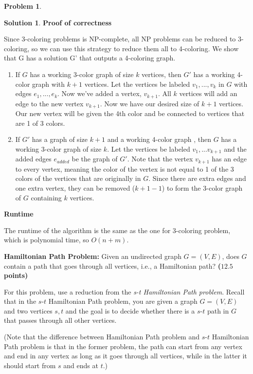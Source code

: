 \documentclass{article}
\theoremstyle{definition}
\newtheorem{problem}{Problem}
\newtheorem*{solution*}{Solution}
\newenvironment{solution}{\begin{solution*}}{{} \end{solution*}}
\newcommand{\grade}[1]{\hfill{\textbf{($\mathbf{#1}$ points)}}}
\begin{document}
\begin{problem}
\begin{enumerate}[label=(\alph*)]
\begin{solution}
		\item\textbf{Proof of correctness}
		\item Since 3-coloring problems is NP-complete, all NP problems can be reduced to 3-coloring, so we can use this strategy to reduce them all to 4-coloring. We show that G has a solution G' that outputs a 4-coloring graph.
		\begin{enumerate}
		\item If $G$ has a working 3-color graph of size $k$ vertices, then $G'$ has a working 4-color graph with $k+1$ vertices. Let the vertices be labeled $v_1, ... , v_k$ in $G$ with edges $e_1, ..., e_k$. Now we've added a vertex, $v_{k+1}$. All $k$ vertices will add an edge to the new vertex $v_{k+1}$. Now we have our desired size of $k + 1$ vertices. Our new vertex will be given the 4th color and be connected to vertices that are 1 of 3 colors. 
		\item If $G'$ has a graph of size $k + 1$ and a working 4-color graph , then $G$ has a working 3-color graph of size $k$. Let the vertices be labeled $v_1, ... v_{k+1}$ and the added edges $e_{added}$ be the graph of $G'$. Note that the vertex $v_{k+1}$ has an edge to every vertex, meaning the color of the vertex is not equal to 1 of the 3 colors of the vertices that are originally in $G$. Since there are extra edges and one extra vertex, they can be removed ($k+1-1$) to form the 3-color graph of $G$ containing $k$ vertices. 
		\end{enumerate}

		\item\textbf{Runtime}
		\item The runtime of the algorithm is the same as the one for 3-coloring problem, which is polynomial time, so $O(n+m)$.
		\end{solution}
		
		\newpage
		\item \textbf{Hamiltonian Path Problem:} Given an undirected graph $G=(V,E)$, does $G$ contain a path that goes through all vertices, i.e., a Hamiltonian path?  \grade{12.5}
	
	\medskip
		For this problem, use a reduction from the \emph{s-t Hamiltonian Path problem}. Recall that in the $s$-$t$ Hamiltonian Path problem, you are given a graph $G=(V,E)$ and two vertices $s,t$ and the goal is to decide whether there is a $s$-$t$ 
		path in $G$ that passes through all other vertices. 
		
		(Note that the difference between Hamiltonian Path problem and $s$-$t$ Hamiltonian Path problem is that in the former problem, the path can start from any vertex and end in any vertex as long as it goes through all vertices, 
		while in the latter it should start from $s$ and ends at $t$.)
		

\end{enumerate}
\end{problem}
\end{document}
